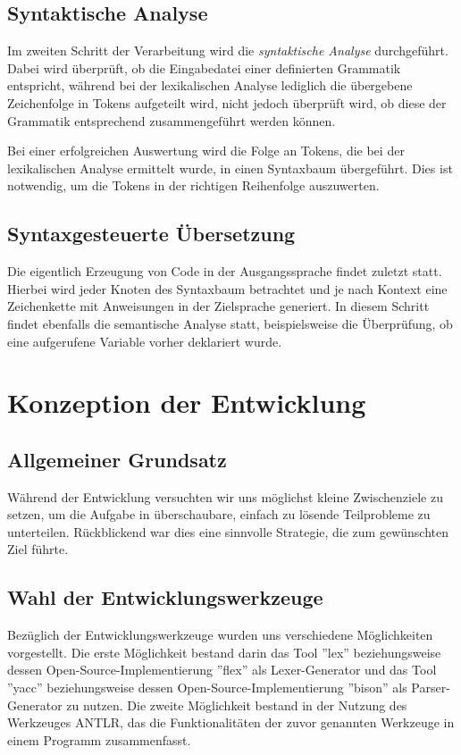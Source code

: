 \documentclass[12pt, a4paper, oneside, ngerman]{article}
\begin{document}
\subsection{Syntaktische Analyse}
Im zweiten Schritt der Verarbeitung wird die \textit{syntaktische Analyse} durchgeführt. Dabei wird überprüft, ob die Eingabedatei einer definierten Grammatik entspricht, während bei der lexikalischen Analyse lediglich die übergebene Zeichenfolge in Tokens aufgeteilt wird, nicht jedoch überprüft wird, ob diese der Grammatik entsprechend zusammengeführt werden können. 

Bei einer erfolgreichen Auswertung wird die Folge an Tokens, die bei der lexikalischen Analyse ermittelt wurde, in einen Syntaxbaum übergeführt. Dies ist notwendig, um die Tokens in der richtigen Reihenfolge auszuwerten. 

\subsection{Syntaxgesteuerte Übersetzung}
Die eigentlich Erzeugung von Code in der Ausgangssprache findet zuletzt statt. Hierbei wird jeder Knoten des Syntaxbaum betrachtet und je nach Kontext eine Zeichenkette mit Anweisungen in der Zielsprache generiert. In diesem Schritt findet ebenfalls die semantische Analyse statt, beispielsweise die Überprüfung, ob eine aufgerufene Variable vorher deklariert wurde.

\pagebreak
\section{Konzeption der Entwicklung}
\subsection{Allgemeiner Grundsatz}
Während der Entwicklung versuchten wir uns möglichst kleine Zwischenziele zu setzen, um die Aufgabe in überschaubare, einfach zu lösende Teilprobleme zu unterteilen. Rückblickend war dies eine sinnvolle Strategie, die zum gewünschten Ziel führte.

\subsection{Wahl der Entwicklungswerkzeuge}
Bezüglich der Entwicklungswerkzeuge wurden uns verschiedene Möglichkeiten vorgestellt. Die erste Möglichkeit bestand darin das Tool ''lex'' beziehungsweise dessen Open-Source-Implementierung ''flex'' als Lexer-Generator und das Tool ''yacc'' beziehungsweise dessen Open-Source-Implementierung ''bison'' als Parser-Generator zu nutzen. Die zweite Möglichkeit bestand in der Nutzung des Werkzeuges ANTLR, das die Funktionalitäten der zuvor genannten Werkzeuge in einem Programm zusammenfasst.
\end{document}
